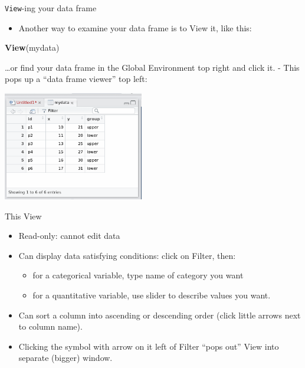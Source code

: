 \documentclass[
  ignorenonframetext,
]{beamer}
\newenvironment{Shaded}{\begin{snugshade}}{\end{snugshade}}
\newcommand{\KeywordTok}[1]{\textcolor[rgb]{0.13,0.29,0.53}{\textbf{#1}}}
\newcommand{\NormalTok}[1]{#1}
\providecommand{\tightlist}{%
  \setlength{\itemsep}{0pt}\setlength{\parskip}{0pt}}
\begin{document}
\begin{frame}[fragile]{\texttt{View}-ing your data frame}
\protect\hypertarget{view-ing-your-data-frame}{}

\begin{itemize}
\tightlist
\item
  Another way to examine your data frame is to View it, like this:
\end{itemize}

\begin{Shaded}
\begin{Highlighting}[]
\KeywordTok{View}\NormalTok{(mydata)}
\end{Highlighting}
\end{Shaded}

\ldots or find your data frame in the Global Environment top right and
click it. - This pops up a ``data frame viewer'' top left:

\includegraphics[width=\textwidth,height=1.875in]{viewview.png}

\end{frame}

\begin{frame}{This View}
\protect\hypertarget{this-view}{}

\begin{itemize}
\tightlist
\item
  Read-only: cannot edit data
\item
  Can display data satisfying conditions: click on Filter, then:

  \begin{itemize}
  \tightlist
  \item
    for a categorical variable, type name of category you want
  \item
    for a quantitative variable, use slider to describe values you want.
  \end{itemize}
\item
  Can sort a column into ascending or descending order (click little
  arrows next to column name).
\item
  Clicking the symbol with arrow on it left of Filter ``pops out'' View
  into separate (bigger) window.
\end{itemize}

\end{frame}
\end{document}
